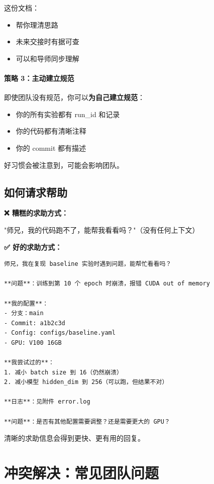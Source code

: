 这份文档：
\begin{itemize}
  \item 帮你理清思路
  \item 未来交接时有据可查
  \item 可以和导师同步理解
\end{itemize}

\paragraph{策略 3：主动建立规范}

即使团队没有规范，你可以\textbf{为自己建立规范}：
\begin{itemize}
  \item 你的所有实验都有 run\_id 和记录
  \item 你的代码都有清晰注释
  \item 你的 commit 都有描述
\end{itemize}

好习惯会被注意到，可能会影响团队。

\subsection{如何请求帮助}

\textbf{❌ 糟糕的求助方式：}

"师兄，我的代码跑不了，能帮我看看吗？"（没有任何上下文）

\textbf{✅ 好的求助方式：}

\begin{verbatim}
师兄，我在复现 baseline 实验时遇到问题，能帮忙看看吗？

**问题**：训练到第 10 个 epoch 时崩溃，报错 CUDA out of memory

**我的配置**：
- 分支：main
- Commit: a1b2c3d
- Config: configs/baseline.yaml
- GPU: V100 16GB

**我尝试过的**：
1. 减小 batch size 到 16（仍然崩溃）
2. 减小模型 hidden_dim 到 256（可以跑，但结果不对）

**日志**：见附件 error.log

**问题**：是否有其他配置需要调整？还是需要更大的 GPU？
\end{verbatim}

清晰的求助信息会得到更快、更有用的回复。

\section{冲突解决：常见团队问题}

